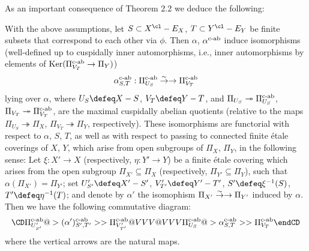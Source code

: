 As an important consequence of Theorem 2.2 we deduce the following:

 With the above assumptions,
let $S\subset X^{\cl}-E_X$,  
$T\subset Y^{\cl}-E_Y$ be finite subsets that correspond 
to each other via $\phi$. Then $\alpha$, $\alpha ^{\text{\rm c-ab}}$ induce 
isomorphisms (well-defined up to cuspidally inner automorphisms, i.e.,
inner automorphisms by elements of $\operatorname {Ker} (\Pi _{V_T}^{\text{\rm c-ab}} \to \Pi_Y)$)
$$\alpha_{S,T}^{\text{\rm c-ab}}: 
\Pi_{U_S}^{\text{\rm c-ab}}\overset \sim \to \rightarrow \Pi _{V_T}^{\text{\rm c-ab}}$$
lying over $\alpha$, where $U_S\defeq X-S$, $V_T\defeq Y-T$, 
and $\Pi_{U_S}\twoheadrightarrow \Pi_{U_S}^{\text{\rm c-ab}}$,
$\Pi_{V_T}\twoheadrightarrow \Pi_{V_T}^{\text{\rm c-ab}}$, are the maximal cuspidally 
abelian quotients (relative to the maps $\Pi_{U_S}\twoheadrightarrow \Pi_X$,
$\Pi_{V_T}\twoheadrightarrow \Pi_Y$, respectively).
These isomorphisms are functorial with respect to $\alpha$, $S$, 
$T$, as well as with respect to passing to connected finite \'etale coverings
of $X$, $Y$, which arise from open subgroups of $\Pi_X$, $\Pi_Y$, 
in the following sense:
Let $\xi:X'\to X$ (respectively, $\eta : Y'\to Y$) be a finite \'etale covering
which arises from the open subgroup $\Pi_{X'}\subseteq \Pi_X$ (respectively,  
$\Pi_{Y'}\subseteq \Pi_Y$), such that $\alpha (\Pi_{X'})=\Pi_{Y'}$; 
set $U'_{S'}\defeq X'-S'$, $V'_{T'}\defeq Y'-T'$, 
$S' \defeq \xi ^{-1} (S)$, $T' \defeq \eta^{-1} (T)$; 
and denote by $\alpha'$ the isomophism 
$\Pi_{X'}\overset \sim \to \rightarrow\Pi_{Y'}$ induced by $\alpha$. 
Then we have the following commutative diagram:
$$
\CD
\Pi_{U'_{S'}}^{\text{\rm c-ab}} @>{(\alpha')_{S',T'}^{\text{\rm c-ab}}}>> 
\Pi_{V'_{T'}}^{\text{\rm c-ab}}  \\
@VVV                            @VVV        \\
\Pi_{U_S}^{\text{\rm c-ab}} @>{\alpha_{S,T}^{\text{\rm c-ab}}}>> \Pi_{V_{T}}^{\text{\rm c-ab}}  \\
\endCD
$$
where the vertical arrows are the natural maps. 
\endproclaim

